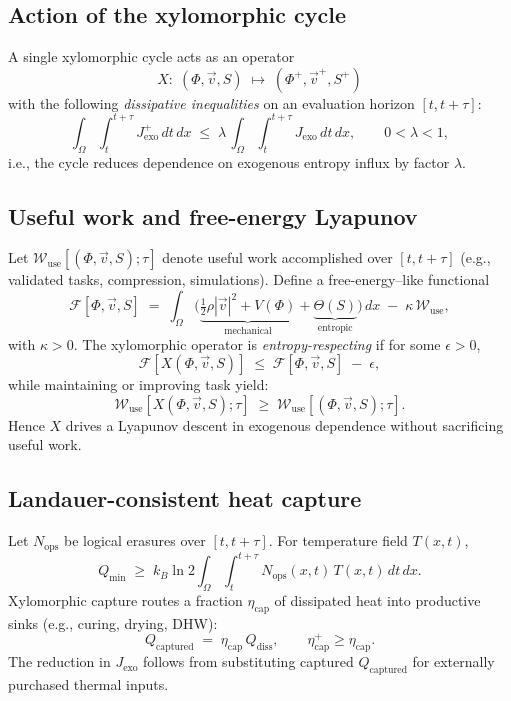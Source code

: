 \documentclass[12pt]{article}
\theoremstyle{plain}
\begin{document}
{{{{{{{{{{{{{{{\subsection*{Action of the xylomorphic cycle}
A single xylomorphic cycle acts as an operator
\[
X:\;(\Phi,\vec v,S)\;\longmapsto\;(\Phi^{+},\vec v^{+},S^{+})
\]
with the following \emph{dissipative inequalities} on an evaluation horizon \([t,t+\tau]\):
\[
\int_{\Omega}\!\!\int_{t}^{t+\tau} J_{\text{exo}}^{+}\,dt\,dx \;\le\; \lambda\,
\int_{\Omega}\!\!\int_{t}^{t+\tau} J_{\text{exo}}\,dt\,dx,
\qquad 0<\lambda<1,
\]
i.e., the cycle reduces dependence on exogenous entropy influx by factor \(\lambda\).

\subsection*{Useful work and free-energy Lyapunov}
Let \(\mathcal{W}_{\text{use}}[(\Phi,\vec v,S);\tau]\) denote useful work accomplished over \([t,t+\tau]\) (e.g., validated tasks, compression, simulations). Define a free-energy–like functional
\[
\mathcal{F}[\Phi,\vec v,S] \;=\; \int_{\Omega}\!\big( \underbrace{\tfrac{1}{2}\rho|\vec v|^2 + V(\Phi)}_{\text{mechanical}} 
+ \underbrace{\Theta(S)}_{\text{entropic}} \big)\,dx
\;-\; \kappa\,\mathcal{W}_{\text{use}},
\]
with \(\kappa>0\). The xylomorphic operator is \emph{entropy-respecting} if for some \(\epsilon>0\),
\[
\mathcal{F}[X(\Phi,\vec v,S)] \;\le\; \mathcal{F}[\Phi,\vec v,S] \;-\; \epsilon,
\]
while maintaining or improving task yield:
\[
\mathcal{W}_{\text{use}}[X(\Phi,\vec v,S);\tau] \;\ge\; \mathcal{W}_{\text{use}}[(\Phi,\vec v,S);\tau].
\]
Hence \(X\) drives a Lyapunov descent in exogenous dependence without sacrificing useful work.

\subsection*{Landauer-consistent heat capture}
Let \(N_{\text{ops}}\) be logical erasures over \([t,t+\tau]\). For temperature field \(T(x,t)\),
\[
Q_{\min} \;\ge\; k_B \ln 2 \int_{\Omega}\!\!\int_{t}^{t+\tau} N_{\text{ops}}(x,t)\,T(x,t)\,dt\,dx.
\]
Xylomorphic capture routes a fraction \(\eta_{\text{cap}}\) of dissipated heat into productive sinks (e.g., curing, drying, DHW):
\[
Q_{\text{captured}} \;=\; \eta_{\text{cap}}\, Q_{\text{diss}}, 
\qquad \eta_{\text{cap}}^{+} \ge \eta_{\text{cap}}.
\]
The reduction in \(J_{\text{exo}}\) follows from substituting captured \(Q_{\text{captured}}\) for externally purchased thermal inputs.

}}}}}}}}}}}}}}}
\end{document}
